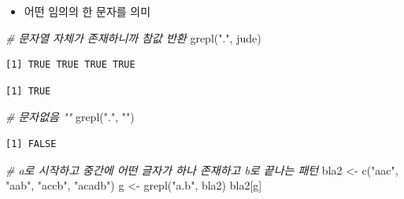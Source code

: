\documentclass[
  11pt,
]{krantz}
\newenvironment{Shaded}{\begin{snugshade}}{\end{snugshade}}
\newcommand{\CommentTok}[1]{\textcolor[rgb]{0.37,0.37,0.37}{\textit{#1}}}
\newcommand{\FunctionTok}[1]{\textcolor[rgb]{0,0,0}{#1}}
\newcommand{\NormalTok}[1]{#1}
\newcommand{\OtherTok}[1]{\textcolor[rgb]{0.37,0.37,0.37}{#1}}
\newcommand{\StringTok}[1]{\textcolor[rgb]{0.5,0.5,0.5}{#1}}
\providecommand{\tightlist}{%
  \setlength{\itemsep}{0pt}\setlength{\parskip}{0pt}}
\begin{document}
\begin{itemize}
\tightlist
\item
  어떤 임의의 한 문자를 의미
\end{itemize}

\footnotesize

\begin{Shaded}
\begin{Highlighting}[]
\CommentTok{\# 문자열 자체가 존재하니까 참값 반환}
\FunctionTok{grepl}\NormalTok{(}\StringTok{"."}\NormalTok{, jude) }
\end{Highlighting}
\end{Shaded}

\begin{verbatim}
[1] TRUE TRUE TRUE TRUE
\end{verbatim}

\begin{Shaded}
\end{Shaded}

\begin{verbatim}
[1] TRUE
\end{verbatim}

\begin{Shaded}
\begin{Highlighting}[]
\CommentTok{\# 문자없음 ""}
\FunctionTok{grepl}\NormalTok{(}\StringTok{"."}\NormalTok{, }\StringTok{""}\NormalTok{)}
\end{Highlighting}
\end{Shaded}

\begin{verbatim}
[1] FALSE
\end{verbatim}

\begin{Shaded}
\begin{Highlighting}[]
\CommentTok{\# a로 시작하고 중간에 어떤 글자가 하나 존재하고 b로 끝나는 패턴 }
\NormalTok{bla2 }\OtherTok{\textless{}{-}} \FunctionTok{c}\NormalTok{(}\StringTok{"aac"}\NormalTok{, }\StringTok{"aab"}\NormalTok{, }\StringTok{"accb"}\NormalTok{, }\StringTok{"acadb"}\NormalTok{)}
\NormalTok{g }\OtherTok{\textless{}{-}} \FunctionTok{grepl}\NormalTok{(}\StringTok{"a.b"}\NormalTok{, bla2)}
\NormalTok{bla2[g]}
\end{Highlighting}
\end{Shaded}
\end{document}
